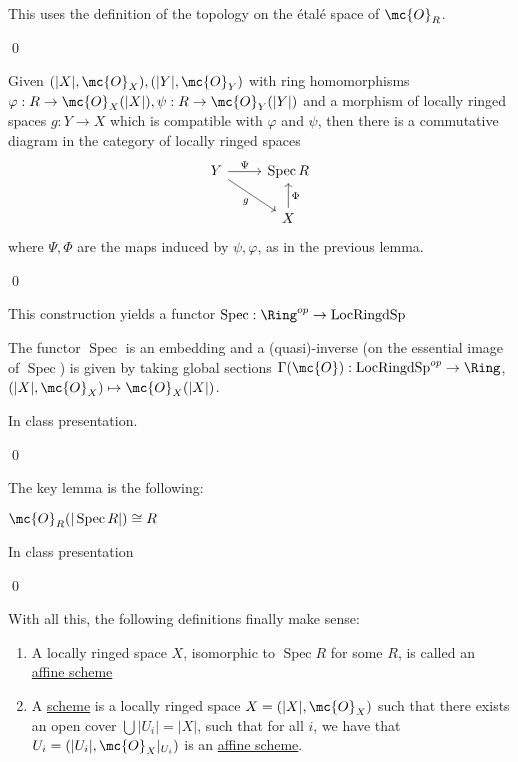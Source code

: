 \documentclass[x11names,reqno,14pt]{extarticle}
\DeclareMathOperator{\Spec}{Spec}
\begin{document}
This uses the definition of the topology on the \'etal\'e space of $\mc{O}_R$. 

\qed

\lem 

Given $(|X|, \mc{O}_X), (|Y|,\mc{O}_Y)$ with ring homomorphisms $\varphi:R \to \mc{O}_X(|X|), \psi:R \to \mc{O}_Y(|Y|)$ and a morphism of locally ringed spaces $g:Y\to X$ which is compatible with $\varphi$ and $\psi$, then there is a commutative diagram in the category of locally ringed spaces
\[
\begin{tikzcd}
Y \ar[r,"\Psi"] \ar[dr, "g"'] & \Spec R \\
& X \ar[u, "\Phi"']
\end{tikzcd}
\]
where $\Psi, \Phi$ are the maps induced by $\psi, \varphi$, as in the previous lemma. 

\proof

\qed

This construction yields a functor $\Spec:\Ring^{op} \to \operatorname{LocRingdSp}$

\thm

The functor $\Spec$ is an embedding and a (quasi)-inverse (on the essential image of $\Spec$) is given by taking global sections $\Gamma(\mc{O}):\operatorname{LocRingdSp}^{op}\to\Ring$, $(|X|,\mc{O}_X) \mapsto \mc{O}_X(|X|)$.

\proof

In class presentation. 

\qed

The key lemma is the following:

\lem

$\mc{O}_R(|\Spec R|) \cong R$

\proof

In class presentation

\qed

With all this, the following definitions finally make sense:
\,
\,
\begin{enumerate}

\item A locally ringed space $X$, isomorphic to $\Spec R$ for some $R$, is called an \underline{affine scheme}

\item A \underline{scheme} is a locally ringed space $X = (|X|, \mc{O}_X)$ such that there exists an open cover $\bigcup|U_i| = |X|$, such that for all $i$, we have that $U_i = (|U_i|, \mc{O}_X|_{U_i})$ is an \underline{affine scheme}.

\end{enumerate}
\end{document}
